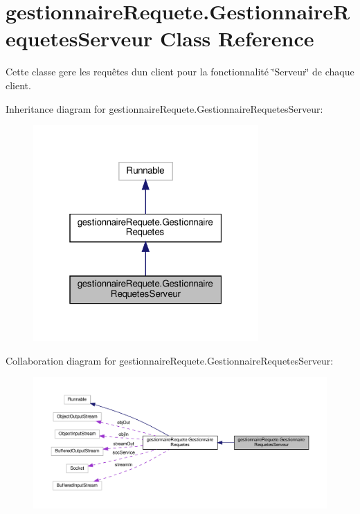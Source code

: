 \hypertarget{classgestionnaireRequete_1_1GestionnaireRequetesServeur}{}\section{gestionnaire\+Requete.\+Gestionnaire\+Requetes\+Serveur Class Reference}
\label{classgestionnaireRequete_1_1GestionnaireRequetesServeur}


Cette classe gere les requêtes d\textquotesingle{}un client pour la fonctionnalité \char`\"{}\+Serveur\char`\"{} de chaque client.  




Inheritance diagram for gestionnaire\+Requete.\+Gestionnaire\+Requetes\+Serveur\+:\nopagebreak
\begin{figure}[H]
\begin{center}
\leavevmode
\includegraphics[width=244pt]{classgestionnaireRequete_1_1GestionnaireRequetesServeur__inherit__graph}
\end{center}
\end{figure}


Collaboration diagram for gestionnaire\+Requete.\+Gestionnaire\+Requetes\+Serveur\+:\nopagebreak
\begin{figure}[H]
\begin{center}
\leavevmode
\includegraphics[width=350pt]{classgestionnaireRequete_1_1GestionnaireRequetesServeur__coll__graph}
\end{center}
\end{figure}

